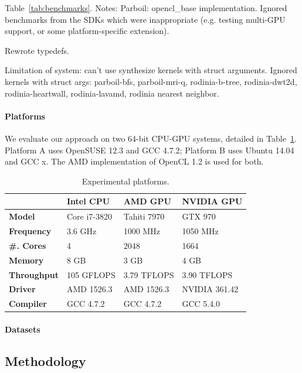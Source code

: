 \documentclass[preprint,nonatbib,10pt,nocopyrightspace]{sigplanconf}
\begin{document}
Table~\ref{tab:benchmarks}. Notes: Parboil: opencl\_base
implementation. Ignored benchmarks from the SDKs which were
inappropriate (e.g. testing multi-GPU support, or some
platform-specific extension).

Rewrote typedefs.

Limitation of system: can't use synthesize kernels with struct
arguments. Ignored kernels with struct args: %
parboil-bfs, %
parboil-mri-q, %
rodinia-b-tree, %
rodinia-dwt2d, %
rodinia-heartwall, %
rodinia-lavamd, %
rodinia nearest neighbor.


\paragraph{Platforms} We evaluate our approach on two 64-bit CPU-GPU
systems, detailed in Table~\ref{tab:platforms}. Platform A uses
OpenSUSE 12.3 and GCC 4.7.2; Platform B uses Ubuntu 14.04 and GCC
x. The AMD implementation of OpenCL 1.2 is used for both.

\begin{table}%
  \scriptsize
  \centering
  \begin{tabular}{l l l l}
    \toprule
    & \textbf{Intel CPU} & \textbf{AMD GPU} & \textbf{NVIDIA GPU} \\
    \midrule
    \textbf{Model} & Core i7-3820 & Tahiti 7970 & GTX 970 \\
    \textbf{Frequency} & 3.6 GHz & 1000 MHz & 1050 MHz \\
    \textbf{\#. Cores} & 4 & 2048 & 1664 \\
    \textbf{Memory} & 8 GB & 3 GB & 4 GB \\
    \textbf{Throughput} & 105 GFLOPS & 3.79 TFLOPS & 3.90 TFLOPS \\
    \textbf{Driver} & AMD 1526.3 & AMD 1526.3 & NVIDIA 361.42 \\
    \textbf{Compiler} & GCC 4.7.2 & GCC 4.7.2 & GCC 5.4.0 \\
    \bottomrule
  \end{tabular}
  \caption{Experimental platforms.}
  \label{tab:platforms}
\end{table}


\paragraph{Datasets}


\subsection{Methodology}
\end{document}
